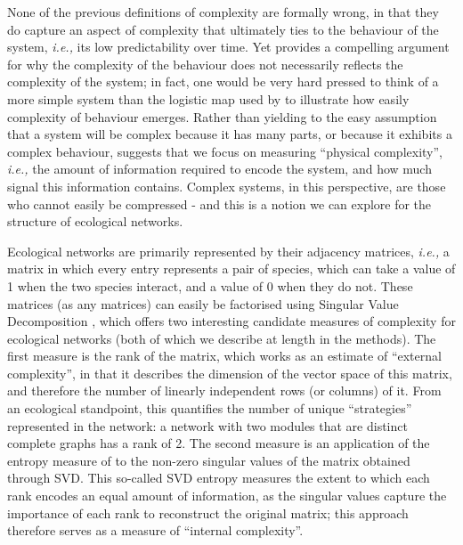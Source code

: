 None of the previous definitions of complexity are formally wrong, in that they
do capture an aspect of complexity that ultimately ties to the behaviour of the
system, \emph{i.e.,} its low predictability over time. Yet
\cite{Adami2002WhaCom} provides a compelling argument for why the
complexity of the behaviour does not necessarily reflects the complexity of the
system; in fact, one would be very hard pressed to think of a more simple system
than the logistic map used by \cite{May1976SimMat} to illustrate how easily
complexity of behaviour emerges. Rather than yielding to the easy assumption
that a system will be complex because it has many parts, or because it exhibits
a complex behaviour, \cite{Adami2002WhaCom} suggests that we focus on
measuring ``physical complexity'', \emph{i.e.,} the amount of information
required to encode the system, and how much signal this information contains.
Complex systems, in this perspective, are those who cannot easily be compressed
- and this is a notion we can explore for the structure of ecological networks.

Ecological networks are primarily represented by their adjacency matrices,
\emph{i.e.,} a matrix in which every entry represents a pair of species, which
can take a value of 1 when the two species interact, and a value of 0 when they
do not. These matrices (as any matrices) can easily be factorised using Singular
Value Decomposition \cite{Forsythe1967ComSol, Golub1971SinVal}, which offers two
interesting candidate measures of complexity for ecological networks (both of
which we describe at length in the methods). The first measure is the rank of
the matrix, which works as an estimate of ``external complexity'', in that it
describes the dimension of the vector space of this matrix, and therefore the
number of linearly independent rows (or columns) of it. From an ecological
standpoint, this quantifies the number of unique ``strategies'' represented in
the network: a network with two modules that are distinct complete graphs has a
rank of 2. The second measure is an application of the entropy measure of
\cite{Shannon1948MatThe} to the non-zero singular values of the matrix
obtained through SVD. This so-called SVD entropy measures the extent to which
each rank encodes an equal amount of information, as the singular values capture
the importance of each rank to reconstruct the original matrix; this approach
therefore serves as a measure of ``internal complexity''.

